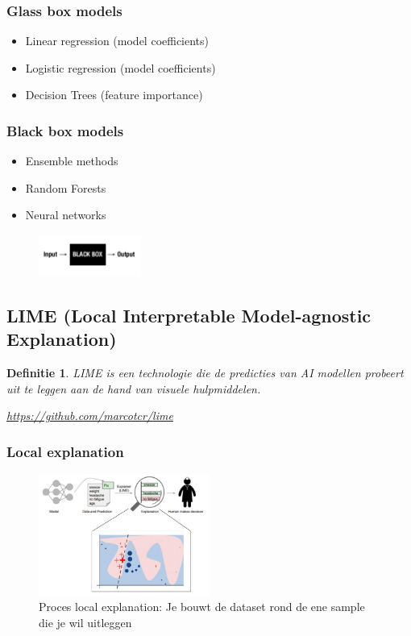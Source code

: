 \documentclass{article}
\newtheorem{theorem}{Definitie}[section]
\begin{document}
\subsubsection{Glass box models}

\begin{itemize}
    \item Linear regression (model coefficients)
    \item Logistic regression (model coefficients)
    \item Decision Trees (feature importance)
\end{itemize}

\subsubsection{Black box models}

\begin{itemize}
    \item Ensemble methods
    \item Random Forests
    \item Neural networks
\end{itemize}

\begin{figure}[H]
    \centering
    \includegraphics[width=0.3\textwidth]{black-box.png}
\end{figure}

\subsection{LIME (Local Interpretable Model-agnostic Explanation)}

\begin{theorem}
    LIME is een technologie die de predicties van AI modellen probeert uit te leggen
    aan de hand van visuele hulpmiddelen.

    \url{https://github.com/marcotcr/lime}
\end{theorem}

\subsubsection{Local explanation}

\begin{figure}[H]
    \centering
    \includegraphics[width=0.5\textwidth]{lime-local.png}
    \caption{Proces local explanation: Je bouwt de dataset rond de ene sample die je wil uitleggen}
\end{figure}
\end{document}
